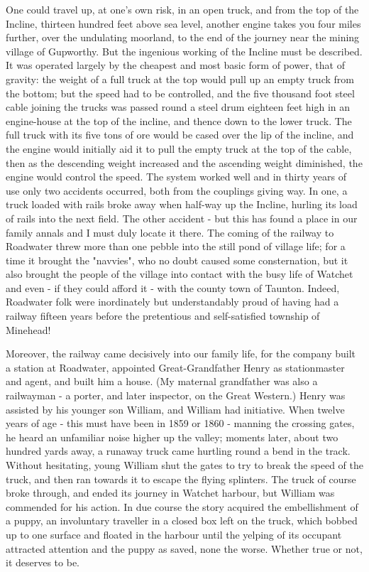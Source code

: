One could travel up, at one's own risk, in an open truck, and from the top of the Incline, thirteen hundred feet above sea level, another engine takes you four miles further, over the undulating moorland, to the end of the journey near the mining village of Gupworthy. But the ingenious working of the Incline must be described. It was operated largely by the cheapest and most basic form of power, that of gravity: the weight of a full truck at the top would pull up an empty truck from the bottom; but the speed had to be controlled, and the five thousand foot steel cable joining the trucks was passed round a steel drum eighteen feet high in an engine-house at the top of the incline, and thence down to the lower truck. The full truck with its five tons of ore would be cased over the lip of the incline, and the engine would initially aid it to pull the empty truck at the top of the cable, then as the descending weight increased and the ascending weight diminished, the engine would control the speed. The system worked well and in thirty years of use only two accidents occurred, both from the couplings giving way. In one, a truck loaded with rails broke away when half-way up the Incline, hurling its load of rails into the next field. The other accident - but this has found a place in our family annals and I must duly locate it there.
The coming of the railway to Roadwater threw more than one pebble into the still pond of village life; for a time it brought the "navvies", who no doubt caused some consternation, but it also brought the people of the village into contact with the busy life of Watchet and even - if they could afford it - with the county town of Taunton. Indeed, Roadwater folk were inordinately but understandably proud of having had a railway fifteen years before the pretentious and self-satisfied township of Minehead!

Moreover, the railway came decisively into our family life, for the company built a station at Roadwater, appointed Great-Grandfather Henry as stationmaster and agent, and built him a house. (My maternal grandfather was also a railwayman - a porter, and later inspector, on the Great Western.) Henry was assisted by his younger son William, and William had initiative. When twelve years of age - this must have been in 1859 or 1860 - manning the crossing gates, he heard an unfamiliar noise higher up the valley; moments later, about two hundred yards away, a runaway truck came hurtling round a bend in the track. Without hesitating, young William shut the gates to try to break the speed of the truck, and then ran towards it to escape the flying splinters. The truck of course broke through, and ended its journey in Watchet harbour, but William was commended for his action.
In due course the story acquired the embellishment of a puppy, an involuntary traveller in a closed box left on the truck, which bobbed up to one surface and floated in the harbour until the yelping of its occupant attracted attention and the puppy as saved, none the worse. Whether true or not, it deserves to be.

